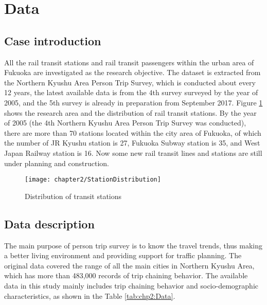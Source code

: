 %
\section{Data}
%
\subsection{Case introduction}
All the rail transit stations and rail transit passengers within the urban area of Fukuoka are investigated as the research objective. The dataset is extracted from the Northern Kyushu Area Person Trip Survey, which is conducted about every 12 years, the latest available data is from the 4th survey surveyed by the year of 2005, and the 5th survey is already in preparation from September 2017. Figure \ref{fig:chp2:StationDistribution} shows the research area and the distribution of rail transit stations. By the year of 2005 (the 4th Northern Kyushu Area Person Trip Survey was conducted), there are more than 70 stations located within the city area of Fukuoka, of which the number of JR Kyushu station is 27, Fukuoka Subway station is 35, and West Japan Railway station is 16. Now some new rail transit lines and stations are still under planning and construction. 

\begin{figure}[htbp]
	\centering
	\texttt{[image: chapter2/StationDistribution]}
	\caption{Distribution of transit stations}
	\label{fig:chp2:StationDistribution}
\end{figure}

%
\subsection{Data description}
The main purpose of person trip survey is to know the travel trends, thus making a better living environment and providing support for traffic planning. The original data covered the range of all the main cities in Northern Kyushu Area, which has more than 483,000 records of trip chaining behavior. The available data in this study mainly includes trip chaining behavior and socio-demographic characteristics, as shown in the Table \ref{tab:chp2:Data}.

